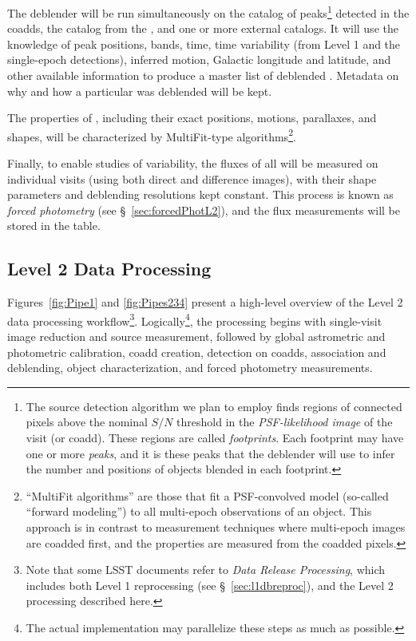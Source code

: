 \documentclass[SE,lsstdraft,toc]{lsstdoc}
\newcommand{\marginreq}[1]{\marginpar{\hspace{0pt}\tiny #1}}
\newcommand{\dmreq}[1]{\marginreq{DMS-REQ-#1}}
\begin{document}
\dmreq{0275}
The deblender will be run simultaneously on the catalog of peaks\footnote{The source detection algorithm we plan to employ finds regions of connected pixels above the nominal $S/N$ threshold in the \emph{PSF-likelihood image} of the visit (or coadd). These regions are called \emph{footprints}. Each footprint may have one or more \emph{peaks}, and it is these peaks that the deblender will use to infer the number and positions of objects blended in each footprint.} detected in the coadds, the \DIAObject catalog from the \DB, and one or more external catalogs.  It will use the knowledge of peak positions, bands, time, time variability (from Level 1 and the single-epoch \Source detections), inferred motion, Galactic longitude and latitude, and other available information to produce a master list of deblended \Objects. Metadata on why and how a particular \Object was deblended will be kept.

\dmreq{0276}
The properties of \Objects, including their exact positions, motions, parallaxes, and shapes, will be characterized by MultiFit-type algorithms\footnote{``MultiFit algorithms'' are those that fit a PSF-convolved model (so-called ``forward modeling'')  to all multi-epoch observations of an object. This approach is in contrast to measurement techniques where multi-epoch images are coadded first, and the properties are measured from the coadded pixels.}.

Finally, to enable studies of variability, the fluxes of all \Objects will be measured on individual visits (using both
direct and difference images), with their shape parameters and deblending resolutions kept constant. This process is known as \emph{forced photometry} (see \S~\ref{sec:forcedPhotL2}), and the flux measurements will be stored in the \ForcedSource table.\dmreq{0268}

\subsection{Level 2 Data Processing}
\label{sec:level2dp}


Figures~\ref{fig:Pipe1} and \ref{fig:Pipes234}
present a high-level overview of the Level 2 data processing workflow\footnote{Note that some LSST documents refer to \emph{Data Release Processing}, which includes both Level 1 reprocessing (see \S~\ref{sec:l1dbreproc}), and the Level 2 processing described here.}. Logically\footnote{The actual implementation may parallelize these steps as much as possible.}, the processing begins with single-visit image reduction and source measurement, followed by global astrometric and photometric calibration, coadd creation, detection on coadds, association and deblending, object characterization, and forced photometry measurements.
\end{document}
